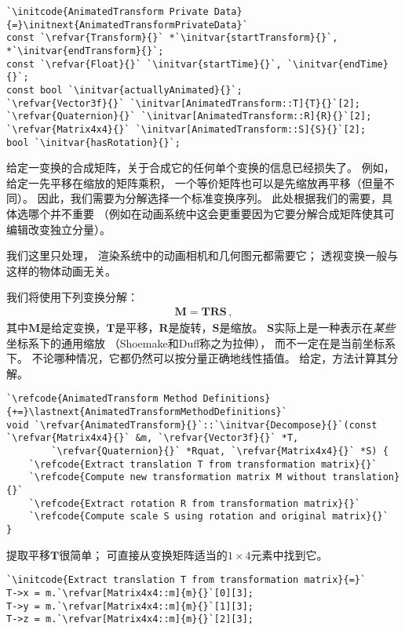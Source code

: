\begin{lstlisting}
`\initcode{AnimatedTransform Private Data}{=}\initnext{AnimatedTransformPrivateData}`
const `\refvar{Transform}{}` *`\initvar{startTransform}{}`, *`\initvar{endTransform}{}`;
const `\refvar{Float}{}` `\initvar{startTime}{}`, `\initvar{endTime}{}`;
const bool `\initvar{actuallyAnimated}{}`;
`\refvar{Vector3f}{}` `\initvar[AnimatedTransform::T]{T}{}`[2];
`\refvar{Quaternion}{}` `\initvar[AnimatedTransform::R]{R}{}`[2];
`\refvar{Matrix4x4}{}` `\initvar[AnimatedTransform::S]{S}{}`[2];
bool `\initvar{hasRotation}{}`;
\end{lstlisting}

给定一变换的合成矩阵，关于合成它的任何单个变换的信息已经损失了。
例如，给定一先平移在缩放的矩阵乘积，
一个等价矩阵也可以是先缩放再平移（但量不同）。
因此，我们需要为分解选择一个标准变换序列。
此处根据我们的需要，具体选哪个并不重要
（例如在动画系统中这会更重要因为它要分解合成矩阵使其可编辑改变独立分量）。

我们这里只处理，
渲染系统中的动画相机和几何图元都需要它；
透视变换一般与这样的物体动画无关。

我们将使用下列变换分解：
\begin{align}\label{eq:2.9}
    \bm M=\bm T\bm R\bm S\, ,
\end{align}
其中$\bm M$是给定变换，$\bm T$是平移，$\bm R$是旋转，$\bm S$是缩放。
$\bm S$实际上是一种表示在\emph{某些}坐标系下的通用缩放
（Shoemake和Duff称之为拉伸），
而不一定在是当前坐标系下。
不论哪种情况，它都仍然可以按分量正确地线性插值。
给定，方法计算其分解。
\begin{lstlisting}
`\refcode{AnimatedTransform Method Definitions}{+=}\lastnext{AnimatedTransformMethodDefinitions}`
void `\refvar{AnimatedTransform}{}`::`\initvar{Decompose}{}`(const `\refvar{Matrix4x4}{}` &m, `\refvar{Vector3f}{}` *T,
        `\refvar{Quaternion}{}` *Rquat, `\refvar{Matrix4x4}{}` *S) {
    `\refcode{Extract translation T from transformation matrix}{}`
    `\refcode{Compute new transformation matrix M without translation}{}`
    `\refcode{Extract rotation R from transformation matrix}{}`
    `\refcode{Compute scale S using rotation and original matrix}{}`
}
\end{lstlisting}

提取平移$\bm T$很简单；
可直接从变换矩阵适当的$1\times4$元素中找到它。
\begin{lstlisting}
`\initcode{Extract translation T from transformation matrix}{=}`
T->x = m.`\refvar[Matrix4x4::m]{m}{}`[0][3];
T->y = m.`\refvar[Matrix4x4::m]{m}{}`[1][3];
T->z = m.`\refvar[Matrix4x4::m]{m}{}`[2][3];
\end{lstlisting}


